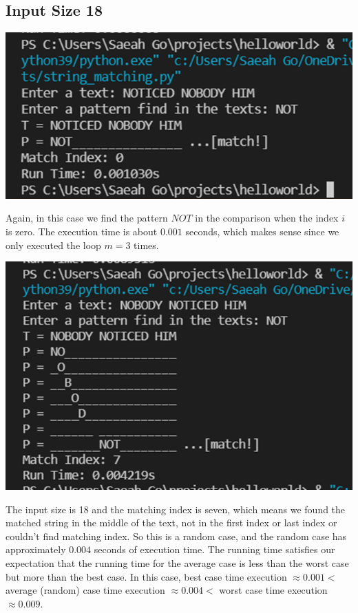\documentclass{article}
\begin{document}
\subsection{\textbf{Input Size 18}} 
\begin{center}
\includegraphics[scale = 0.7]{inputsize 18 best.png} \\
\end{center}
Again, in this case we find the pattern $NOT$ in the comparison when the index $i$ is zero. The execution time is about $0.001$ seconds, which makes sense since we only executed the loop $m=3$ times.
\begin{center}
\includegraphics[scale = 0.7]{inputsize 18 average.png} \\
\end{center}
The input size is 18 and the matching index is seven, which means we found the matched string in the middle of the text, not in the first index or last index or couldn't find matching index. So this is a random case, and the random case has approximately $0.004$ seconds of execution time. The running time satisfies our expectation that the running time for the average case is less than the worst case but more than the best case. In this case, best case time execution $\approx 0.001 <$ average (random) case time execution $\approx 0.004 <$ worst case time execution $\approx 0.009$.
\end{document}

